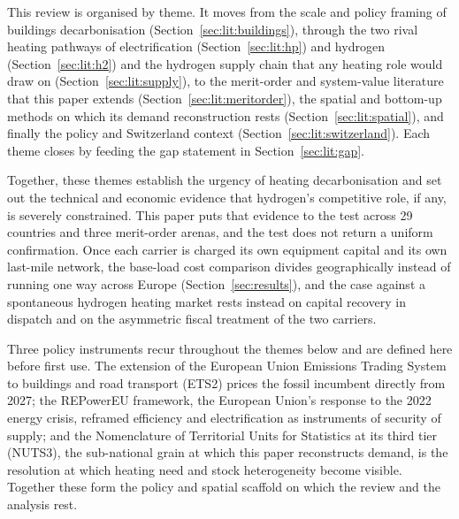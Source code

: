 
This review is organised by theme. It moves from the scale
and policy framing of buildings decarbonisation (Section~\ref{sec:lit:buildings}),
through the two rival heating pathways of electrification (Section~\ref{sec:lit:hp}) and
hydrogen (Section~\ref{sec:lit:h2}) and the hydrogen supply chain that any heating role
would draw on (Section~\ref{sec:lit:supply}), to the merit-order and system-value
literature that this paper extends (Section~\ref{sec:lit:meritorder}), the spatial and
bottom-up methods on which its demand reconstruction rests
(Section~\ref{sec:lit:spatial}), and finally the policy and Switzerland context
(Section~\ref{sec:lit:switzerland}). Each theme closes by feeding the gap statement in
Section~\ref{sec:lit:gap}.

Together, these themes establish the urgency of heating decarbonisation and set out the
technical and economic evidence that hydrogen's competitive role, if any, is severely
constrained. This paper puts that evidence to the test across 29 countries and three merit-order arenas, and the test does not return a uniform confirmation. Once each carrier
is charged its own equipment capital and its own last-mile network, the base-load cost
comparison divides geographically instead of running one way across Europe
(Section~\ref{sec:results}), and the case against a spontaneous hydrogen heating market
rests instead on capital recovery in dispatch and on the asymmetric fiscal treatment of
the two carriers.

Three policy instruments recur throughout the themes below and are defined here
before first use. The extension of the European Union Emissions Trading System to
buildings and road transport (ETS2) prices the fossil incumbent directly from
2027; the REPowerEU framework, the European Union's response to the 2022 energy
crisis, reframed efficiency and electrification as instruments of security of
supply; and the Nomenclature of Territorial Units for Statistics at its third tier
(NUTS3), the sub-national grain at which this paper reconstructs demand, is the
resolution at which heating need and stock heterogeneity become visible. Together
these form the policy and spatial scaffold on which the review and the analysis
rest.

